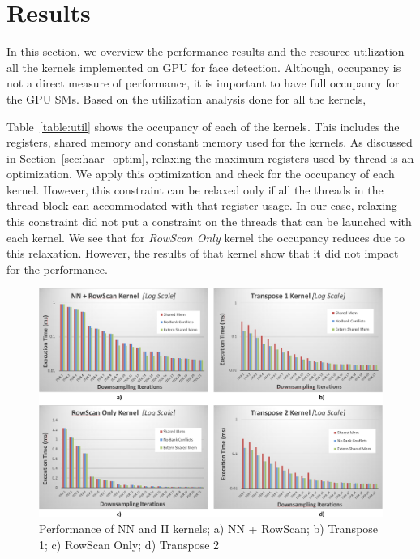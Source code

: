 \section{Results}\label{sec:results}

In this section, we overview the performance results and the resource
utilization all the kernels implemented on GPU for face detection. 
Although, occupancy is not a direct measure of performance, it is important 
to have full occupancy for the GPU SMs. Based on the utilization analysis done for all the kernels,

Table~\ref{table:util} shows the occupancy of each of the kernels. This includes the registers, 
shared memory and constant memory used for the kernels. As discussed in Section~\ref{sec:haar_optim}, 
relaxing the maximum registers used by thread is an optimization. We apply this optimization and check for the 
occupancy of each kernel. 
However, this constraint can be relaxed only if all the threads in the thread block can accommodated with that register usage.
In our case, relaxing this constraint did not put a constraint on the threads that can be launched with each kernel.
We see that for \emph{RowScan Only} kernel the occupancy reduces due to this relaxation. However, the results of that kernel
show that it did not impact for the performance. 


\begin{figure}
  \centering
  \includegraphics[width=\linewidth]{figs/nn_ii_kernels_crop.pdf}
  \caption{Performance of NN and II kernels; a) NN + RowScan; b) Transpose 1; c) RowScan Only; d) Transpose 2}
  \label{fig:nn_ii_kernels}
\end{figure}

